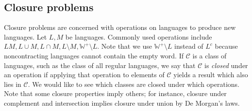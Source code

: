 \subsection{Closure problems}
Closure problems are concerned with operations on languages to produce new languages.
Let \( L, M \) be languages.
Commonly used operations include \( LM, L \cup M, L \cap M, L \setminus M, \mathbb W^+ \setminus L \).
Note that we use \( \mathbb W^+ \setminus L \) instead of \( L^c \) because noncontracting languages cannot contain the empty word.
If \( \mathcal C \) is a class of languages, such as the class of all regular languages, we say that \( \mathcal C \) is \emph{closed} under an operation if applying that operation to elements of \( \mathcal C \) yields a result which also lies in \( \mathcal C \).
We would like to see which classes are closed under which operations.
Note that some closure properties imply others; for instance, closure under complement and intersection implies closure under union by De Morgan's laws.

